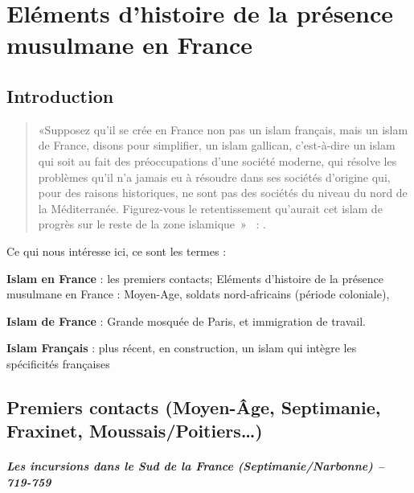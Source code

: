 \chapter{Eléments d’histoire de la présence musulmane en France}


\section{Introduction}


\begin{quote}
    «{Supposez qu’il se crée en France non pas un islam français, mais un islam de France, disons pour simplifier, un islam gallican,} c’est-à-dire un islam qui soit au fait des préoccupations d’une société moderne, qui résolve les problèmes qu’il n’a jamais eu à résoudre dans ses sociétés d’origine qui, pour des raisons historiques, ne sont pas des sociétés du niveau du nord de la Méditerranée. Figurez-vous le retentissement qu’aurait cet islam de progrès sur le reste de la zone islamique »   : .

\end{quote}

Ce qui nous intéresse ici, ce sont les termes : 
\bi
\item \textbf{Islam en France} : les premiers contacts; Eléments d’histoire de la présence musulmane en France : Moyen-Age, soldats
nord-africains (période coloniale), 
\item \textbf{Islam de France} : Grande mosquée de Paris, et immigration de
travail.
\item \textbf{Islam Français} : plus récent, en construction, un islam qui intègre les spécificités françaises

\ei
\section{Premiers contacts (Moyen-Âge, Septimanie, Fraxinet, Moussais/Poitiers…)}



\paragraph{Les incursions dans le Sud de la France (Septimanie/Narbonne) – 719-759}

